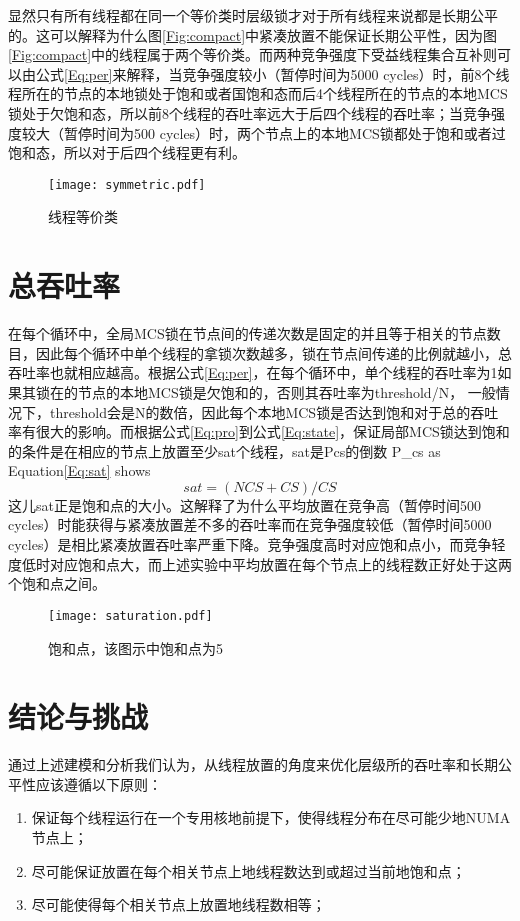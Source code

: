 显然只有所有线程都在同一个等价类时层级锁才对于所有线程来说都是长期公平的。这可以解释为什么图\ref{Fig:compact}中紧凑放置不能保证长期公平性，因为图\ref{Fig:compact}中的线程属于两个等价类。而两种竞争强度下受益线程集合互补则可以由公式\ref{Eq:per}来解释，当竞争强度较小（暂停时间为5000 cycles）时，前8个线程所在的节点的本地锁处于饱和或者国饱和态而后4个线程所在的节点的本地MCS锁处于欠饱和态，所以前8个线程的吞吐率远大于后四个线程的吞吐率；当竞争强度较大（暂停时间为500 cycles）时，两个节点上的本地MCS锁都处于饱和或者过饱和态，所以对于后四个线程更有利。

\begin{figure}[t]
	\centering
	\texttt{[image: symmetric.pdf]}
	\caption{线程等价类}
	\label{Fig:symmetric}
\end{figure}

\section{总吞吐率}
在每个循环中，全局MCS锁在节点间的传递次数是固定的并且等于相关的节点数目，因此每个循环中单个线程的拿锁次数越多，锁在节点间传递的比例就越小，总吞吐率也就相应越高。根据公式\ref{Eq:per}，在每个循环中，单个线程的吞吐率为1如果其锁在的节点的本地MCS锁是欠饱和的，否则其吞吐率为threshold/N， 一般情况下，threshold会是N的数倍，因此每个本地MCS锁是否达到饱和对于总的吞吐率有很大的影响。而根据公式\ref{Eq:pro}到公式\ref{Eq:state}，保证局部MCS锁达到饱和的条件是在相应的节点上放置至少sat个线程，sat是Pcs的倒数
P\_{cs} as Equation\ref{Eq:sat} shows
\begin{equation}\label{Eq:sat}
     sat = (NCS + CS) / CS
\end{equation}
这儿sat正是饱和点的大小。这解释了为什么平均放置在竞争高（暂停时间500 cycles）时能获得与紧凑放置差不多的吞吐率而在竞争强度较低（暂停时间5000 cycles）是相比紧凑放置吞吐率严重下降。竞争强度高时对应饱和点小，而竞争轻度低时对应饱和点大，而上述实验中平均放置在每个节点上的线程数正好处于这两个饱和点之间。

\begin{figure}[t]
	\centering
	\texttt{[image: saturation.pdf]}
	\caption{饱和点，该图示中饱和点为5}
	\label{Fig:saturation}
\end{figure}

\section{结论与挑战}
通过上述建模和分析我们认为，从线程放置的角度来优化层级所的吞吐率和长期公平性应该遵循以下原则：
\begin{enumerate}
  \item 保证每个线程运行在一个专用核地前提下，使得线程分布在尽可能少地NUMA节点上；
  \item 尽可能保证放置在每个相关节点上地线程数达到或超过当前地饱和点；
  \item 尽可能使得每个相关节点上放置地线程数相等；
\end{enumerate}

